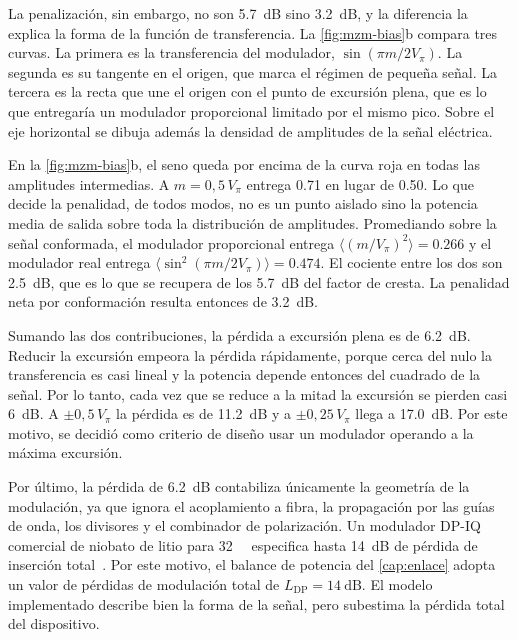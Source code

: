 La penalizaci\'on, sin embargo, no son \SI{5.7}{\dB} sino \SI{3.2}{\dB}, y la
diferencia la explica la forma de la funci\'on de transferencia. La
\cref{fig:mzm-bias}b compara tres curvas. La primera es la transferencia del
modulador, $\sin(\pi m/2V_\pi)$. La segunda es su tangente en el origen, que
marca el r\'egimen de peque\~na se\~nal. La tercera es la recta que une el
origen con el punto de excursi\'on plena, que es lo que entregar\'ia un
modulador proporcional limitado por el mismo pico. Sobre el eje horizontal se
dibuja adem\'as la densidad de amplitudes de la se\~nal el\'ectrica.

En la \cref{fig:mzm-bias}b, el seno queda por encima de la curva roja en todas las amplitudes
intermedias. A $m = 0{,}5\,V_\pi$ entrega \num{0.71} en lugar de \num{0.50}.
Lo que decide la penalidad, de todos modos, no es un punto aislado sino la
potencia media de salida sobre toda la distribuci\'on de amplitudes.
Promediando sobre la se\~nal conformada, el modulador proporcional entrega
$\langle (m/V_\pi)^2 \rangle = \num{0.266}$ y el modulador real entrega
$\langle \sin^2(\pi m/2V_\pi) \rangle = \num{0.474}$. El cociente entre los
dos son \SI{2.5}{\dB}, que es lo que se recupera de los \SI{5.7}{\dB} del
factor de cresta. La penalidad neta por conformaci\'on resulta entonces de
\SI{3.2}{\dB}.

Sumando las dos contribuciones, la p\'erdida a excursi\'on plena es de
\SI{6.2}{\dB}. Reducir la excursi\'on empeora la p\'erdida r\'apidamente, porque cerca del
nulo la transferencia es casi lineal y la potencia depende entonces del
cuadrado de la se\~nal. Por lo tanto, cada vez que se reduce a la mitad la
excursi\'on se pierden casi \SI{6}{\dB}. A $\pm 0{,}5\,V_\pi$ la p\'erdida es
de \SI{11.2}{\dB} y a $\pm 0{,}25\,V_\pi$ llega a \SI{17.0}{\dB}. Por este
motivo, se decidi\'o como criterio de dise\~no usar un modulador operando a la
m\'axima excursi\'on.

Por \'ultimo, la p\'erdida de \SI{6.2}{\dB} contabiliza \'unicamente la
geometr\'ia de la modulaci\'on, ya que ignora el acoplamiento a fibra, la
propagaci\'on por las gu\'ias de onda, los divisores y el combinador de
polarizaci\'on. Un modulador DP-IQ comercial de niobato de litio para
\SI{32}{\giga\baud} especifica hasta \SI{14}{\dB} de p\'erdida de inserci\'on
total~\cite{fujitsu_ftm7977}. Por este motivo, el balance de potencia del
\cref{cap:enlace} adopta un valor de p\'erdidas de modulaci\'on total de
$L_{\mathrm{DP}} = \SI{14}{\dB}$. El modelo implementado describe bien la
forma de la se\~nal, pero subestima la p\'erdida total del dispositivo.

